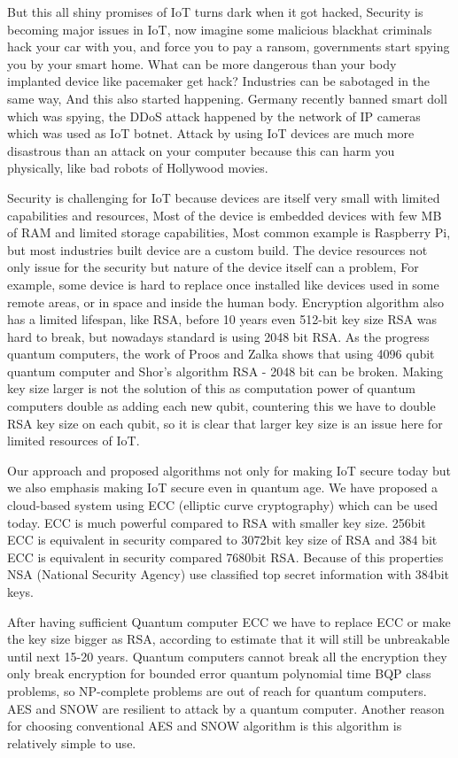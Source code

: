 \documentclass[preprint,10pt,5p]{elsarticle}
\begin{document}
But this all shiny promises of IoT turns dark when it got hacked, Security is becoming major issues in IoT, now imagine some malicious blackhat criminals hack your car with you, and force you to pay a ransom, governments start spying you by your smart home. What can be more dangerous than your body implanted device like pacemaker get hack? Industries can be sabotaged in the same way, And this also started happening. Germany recently banned smart doll which was spying, the DDoS attack happened by the network of IP cameras which was used as IoT botnet. Attack by using IoT devices are much more disastrous than an attack on your computer because this can harm you physically, like bad robots of Hollywood movies.

Security is challenging for IoT because devices are itself very small with limited capabilities and resources, Most of the device is embedded devices with few MB of RAM and limited storage capabilities, Most common example is Raspberry Pi, but most industries built device are a custom build. The device resources not only issue for the security but nature of the device itself can a problem, For example, some device is hard to replace once installed like devices used in some remote areas, or in space and inside the human body. Encryption algorithm also has a limited lifespan, like RSA, before 10 years even 512-bit key size RSA was hard to break, but nowadays standard is using 2048 bit RSA. As the progress quantum computers, the work of Proos and Zalka shows that using 4096 qubit quantum computer and Shor's algorithm RSA - 2048 bit can be broken. \cite{Beckman1996}
Making key size larger is not the solution of this as computation power of quantum computers double as adding each new qubit, countering this we have to double RSA key size on each qubit, so it is clear that larger key size is an issue here for limited resources of IoT.

Our approach and proposed algorithms not only for making IoT secure today but we also emphasis making IoT secure even in quantum age. We have proposed a cloud-based system using ECC (elliptic curve cryptography) which can be used today. ECC is much powerful compared to RSA with smaller key size. 256bit ECC is equivalent in security compared to 3072bit key size of RSA and 384 bit ECC is equivalent in security compared  7680bit RSA. Because of this properties NSA (National Security Agency) use classified top secret information with 384bit keys. 

After having sufficient Quantum computer ECC we have to replace ECC or make the key size bigger as RSA, according to estimate that it will still be unbreakable until next 15-20 years. Quantum computers cannot break all the encryption they only break encryption for bounded error quantum polynomial time BQP class problems, so NP-complete problems are out of reach for quantum computers. AES and SNOW are resilient to attack by a quantum computer. Another reason for choosing conventional AES and SNOW algorithm is this algorithm is relatively simple to use.
\end{document}
